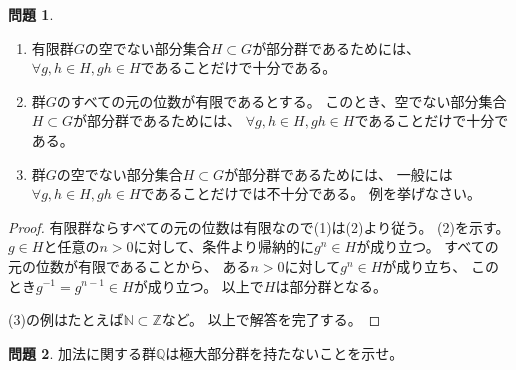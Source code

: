 \documentclass[uplatex]{jsreport}
\theoremstyle{definition}
\newtheorem{prob}[prob]{問題}
\newcommand{\Q}{\mathbb{Q}}
\newcommand{\Z}{\mathbb{Z}}
\newcommand{\N}{\mathbb{N}}
\begin{document}
\begin{prob}
  \
  \begin{enumerate}
    \item
    有限群\(G\)の空でない部分集合\(H\subset G\)が部分群であるためには、
    \(\forall g,h\in H, gh\in H\)であることだけで十分である。
    \item
    群\(G\)のすべての元の位数が有限であるとする。
    このとき、空でない部分集合\(H\subset G\)が部分群であるためには、
    \(\forall g,h\in H, gh\in H\)であることだけで十分である。
    \item
    群\(G\)の空でない部分集合\(H\subset G\)が部分群であるためには、
    一般には\(\forall g,h\in H, gh\in H\)であることだけでは不十分である。
    例を挙げなさい。
  \end{enumerate}
\end{prob}

\begin{proof}
  有限群ならすべての元の位数は有限なので(1)は(2)より従う。
  (2)を示す。
  \(g\in H\)と任意の\(n > 0\)に対して、条件より帰納的に\(g^n\in H\)が成り立つ。
  すべての元の位数が有限であることから、
  ある\(n > 0\)に対して\(g^n\in H\)が成り立ち、
  このとき\(g^{-1} = g^{n-1}\in H\)が成り立つ。
  以上で\(H\)は部分群となる。

  (3)の例はたとえば\(\N\subset \Z\)など。
  以上で解答を完了する。
\end{proof}




\begin{prob}
  加法に関する群\(\Q\)は極大部分群を持たないことを示せ。
\end{prob}
\end{document}
